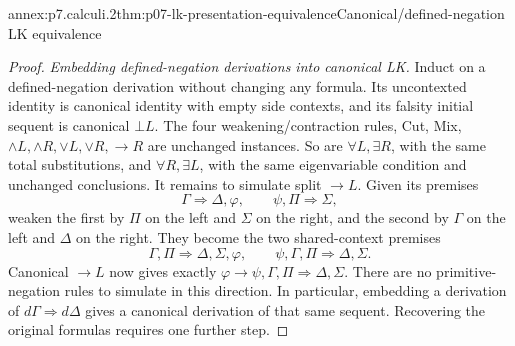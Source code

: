 \begin{annexitem}{annex:p7.calculi.2}{thm:p07-lk-presentation-equivalence}{Canonical/defined-negation LK equivalence}
\begin{proof}
\emph{Embedding defined-negation derivations into canonical LK.}
Induct on a defined-negation derivation without changing any formula.
Its uncontexted identity is canonical identity with empty side contexts,
and its falsity initial sequent is canonical \(\bot L\).  The four
weakening/contraction rules, Cut, Mix,
\(\land L,\land R,\lor L,\lor R,\to R\) are unchanged instances.
So are \(\forall L,\exists R\), with the same total substitutions, and
\(\forall R,\exists L\), with the same eigenvariable condition and
unchanged conclusions.  It remains to simulate split \(\to L\).
Given its premises
\[
 \Gamma\Rightarrow\Delta,\varphi,
 \qquad \psi,\Pi\Rightarrow\Sigma,
\]
weaken the first by \(\Pi\) on the left and \(\Sigma\) on the right,
and the second by \(\Gamma\) on the left and \(\Delta\) on the right.
They become the two shared-context premises
\[
 \Gamma,\Pi\Rightarrow\Delta,\Sigma,\varphi,
 \qquad \psi,\Gamma,\Pi\Rightarrow\Delta,\Sigma.
\]
Canonical \(\to L\) now gives exactly
\(\varphi\to\psi,\Gamma,\Pi\Rightarrow\Delta,\Sigma\).
There are no primitive-negation rules to simulate in this direction.
In particular, embedding a derivation of
\(d\Gamma\Rightarrow d\Delta\) gives a canonical derivation of that
same sequent.  Recovering the original formulas requires one further step.


\end{proof}
\end{annexitem}
